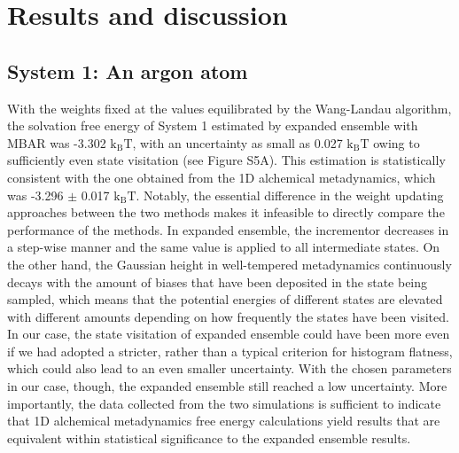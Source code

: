 \documentclass[journal=jacsat,manuscript=article]{achemso}
\begin{document}
\section{Results and discussion}
\subsection{System 1: An argon atom}
With the weights fixed at the values equilibrated by the Wang-Landau algorithm, the solvation free energy of System 1 estimated by expanded ensemble with MBAR was -3.302 $\text{k}_{\text{B}}\text{T}$, with an uncertainty as small as 0.027 $\text{k}_{\text{B}}\text{T}$ owing to sufficiently even state visitation (see Figure S5A). This estimation is statistically consistent with the one obtained from the 1D alchemical metadynamics, which was -3.296 $\pm$ 0.017 $\text{k}_{\text{B}}\text{T}$. Notably, the essential difference in the weight updating approaches between the two methods makes it infeasible to directly compare the performance of the methods. In expanded ensemble, the incrementor decreases in a step-wise manner and the same value is applied to all intermediate states. On the other hand, the Gaussian height in well-tempered metadynamics continuously decays with the amount of biases that have been deposited in the state being sampled, which means that the potential energies of different states are elevated with different amounts depending on how frequently the states have been visited. In our case, the state visitation of expanded ensemble could have been more even if we had adopted a stricter, rather than a typical criterion for histogram flatness, which could also lead to an even smaller uncertainty. With the chosen parameters in our case, though, the expanded ensemble still reached a low uncertainty. More importantly, the data collected from the two simulations is sufficient to indicate that 1D alchemical metadynamics free energy calculations yield results that are equivalent within statistical significance to the expanded ensemble results.
\end{document}
